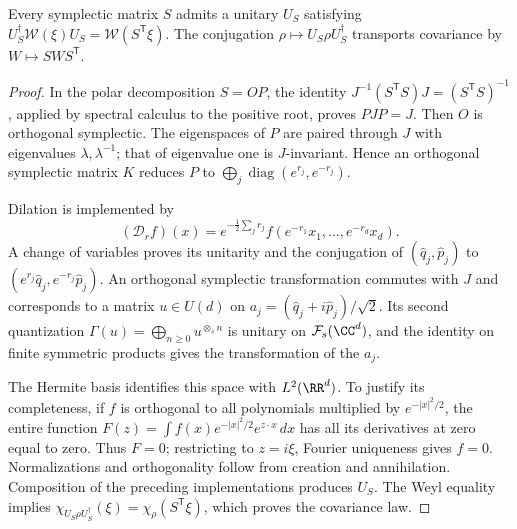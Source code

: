 \begin{lemma}
\label{x_reciprocidad:app:lem:implementacion-simplectica}
Every symplectic matrix \(S\) admits a unitary \(U_S\) satisfying \(U_S^\dagger\mathcal W(\xi)U_S=\mathcal W(S^{\mathsf T}\xi)\). The conjugation \(\rho\mapsto U_S\rho U_S^\dagger\) transports covariance by \(W\mapsto SWS^{\mathsf T}\).
\end{lemma}
\begin{proof}
In the polar decomposition \(S=OP\), the identity
\(J^{-1}(S^{\mathsf T}S)J=(S^{\mathsf T}S)^{-1}\), applied by
spectral calculus to the positive root, proves \(PJP=J\).
Then \(O\) is orthogonal symplectic. The eigenspaces of \(P\)
are paired through \(J\) with eigenvalues \(\lambda,\lambda^{-1}\);
that of eigenvalue one is \(J\)-invariant. Hence an
orthogonal symplectic matrix \(K\) reduces \(P\) to
\(\bigoplus_j\operatorname{diag}(e^{r_j},e^{-r_j})\).

Dilation is implemented by
\[
 (\mathcal D_rf)(x)=e^{-\frac12\sum_jr_j}
 f(e^{-r_1}x_1,\ldots,e^{-r_d}x_d).
\]
A change of variables proves its unitarity and the conjugation of
\((\widehat q_j,\widehat p_j)\) to
\((e^{r_j}\widehat q_j,e^{-r_j}\widehat p_j)\).
An orthogonal symplectic transformation commutes with \(J\) and
corresponds to a matrix \(u\in U(d)\) on
\(a_j=(\widehat q_j+i\widehat p_j)/\sqrt2\). Its second
quantization \(\Gamma(u)=\bigoplus_{n\geq0}u^{\otimes_s n}\)
is unitary on \(\mathcal F_s(\CC^d)\), and the identity on
finite symmetric products gives the transformation of the \(a_j\).

The Hermite basis identifies this space with \(L^2(\RR^d)\).
To justify its completeness, if \(f\) is orthogonal to all
polynomials multiplied by \(e^{-|x|^2/2}\), the entire function
\(F(z)=\int f(x)e^{-|x|^2/2}e^{z\cdot x}\,dx\) has all
its derivatives at zero equal to zero. Thus \(F=0\); restricting to
\(z=i\xi\), Fourier uniqueness gives \(f=0\).
Normalizations and orthogonality follow from creation and annihilation.
Composition of the preceding implementations produces \(U_S\).
The Weyl equality implies
\(\chi_{U_S\rho U_S^\dagger}(\xi)=\chi_\rho(S^{\mathsf T}\xi)\),
which proves the covariance law.
\end{proof}

